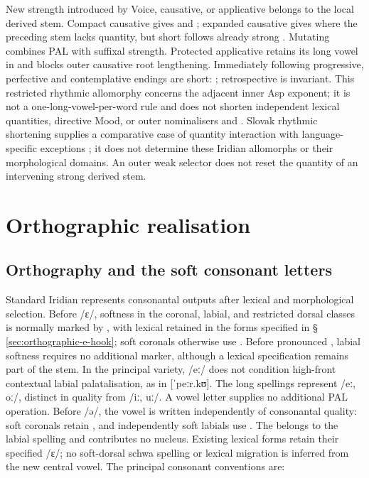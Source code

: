 New strength introduced by Voice, causative, or applicative belongs to the
local derived stem. Compact causative gives  and ;
expanded causative gives  where the preceding stem lacks
quantity, but short  follows already strong .
Mutating  combines PAL with suffixal strength. Protected
applicative  retains its long vowel in  and
blocks outer causative root lengthening. Immediately following progressive,
perfective and contemplative endings are short: ;
retrospective  is invariant. This restricted rhythmic
allomorphy concerns the adjacent inner Asp exponent; it is not a
one-long-vowel-per-word rule and does not shorten independent lexical
quantities, directive Mood, or outer nominalisers
 and . Slovak rhythmic shortening supplies a
comparative case of quantity interaction with language-specific exceptions
\cite{pukanec2016}; it does not determine these Iridian allomorphs or their
morphological domains. An outer weak selector does not reset the
quantity of an intervening strong derived stem.

\section{Orthographic realisation}

\subsection{Orthography and the soft consonant letters}\label{sec:orthography}

Standard Iridian represents consonantal outputs after lexical and
morphological selection. Before /ɛ/, softness in the coronal, labial, and
restricted dorsal classes is normally marked by , with lexical
 retained in the forms specified in §\,\ref{sec:orthographic-e-hook};
soft coronals otherwise use . Before pronounced , labial softness
requires no additional marker, although a lexical specification remains
part of the stem. In the principal variety,  /eː/ does not
condition high-front contextual labial palatalisation, as in
 [ˈpeːr.kʊ]. The long spellings 
represent /eː, oː/, distinct in quality from  /iː, uː/. A vowel
letter supplies no additional PAL operation.
Before /ə/, the vowel is written  independently of consonantal
quality: soft coronals retain , and independently
soft labials use . The  belongs to
the labial spelling and contributes no nucleus. Existing lexical
 forms retain their specified /ɛ/; no soft-dorsal schwa
spelling or lexical migration is inferred from the new central vowel.
The principal consonant conventions are:

